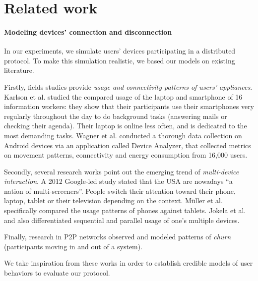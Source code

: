 \section{Related work}%
\label{RelatedWork}


\paragraph*{Modeling devices' connection and disconnection} 
In our experiments, we simulate users' devices participating in a distributed protocol.
To make this simulation realistic, we based our models on existing literature. 

Firstly, fields studies provide \emph{usage and connectivity patterns of users' appliances}.
Karlson et al. \cite{Karlson_Meyers_Jacobs_Johns_Kane_2009} studied the compared usage of the laptop and smartphone of 16 information workers: 
they show that their participants use their smartphones very regularly throughout the day to do background tasks (\eg answering mails or checking their agenda).
Their laptop is online less often, and is dedicated to the most demanding tasks.
Wagner et al. \cite{Wagner_Rice_Beresford_2013} conducted a thorough data collection on Android devices via an application called Device Analyzer, that collected metrics on movement patterns, connectivity and energy consumption from 16,000 users.

Secondly, several research works point out the emerging trend of \emph{multi-device interaction}.
A 2012 Google-led study \cite{google2012} stated that the USA are nowadays ``a nation of multi-screeners''.
People switch their attention toward their phone, laptop, tablet or their television depending on the context.
M\"uller et al. \cite{Muller_Gove_Webb_Cheang_2015} specifically compared the usage patterns of phones against tablets.
Jokela et al. \cite{Jokela_Ojala_Olsson_2015} and \cite{google2012} also differentiated sequential and parallel usage of one's multiple devices.

Finally, research in P2P networks observed \cite{Stutzbach_Rejaie_2006} and modeled \cite{Yao_Leonard_Wang_Loguinov_2006} patterns of \emph{churn} (\ie participants moving in and out of a system).

We take inspiration from these works in order to establish credible models of user behaviors to evaluate our protocol. 


